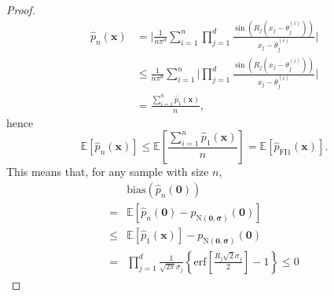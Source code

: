 \documentclass[%
 reprint,
 amsmath,amssymb,
 aps,
]{revtex4-2}
\def\E{\mathbb{E}}
\def\erf{\text{erf}}
\begin{document}
\begin{proof}
\begin{align*}
    \hat{p}_{n}(\mathbf{x}) & = \bigg|\frac{1}{n\pi^d}\sum_{i = 1}^n \prod_{j = 1}^d \frac{\sin(R_j(x_j - \theta_j^{(i)}))}{x_j - \theta_j^{(i)}}\bigg| \\
    & \le \frac{1}{n\pi^d}\sum_{i = 1}^n \bigg|\prod_{j = 1}^d \frac{\sin(R_j(x_j - \theta_j^{(i)}))}{x_j - \theta_j^{(i)}}\bigg|\\
    & = \frac{\sum_{i=1}^n\hat{p}_{\text{1}}(\mathbf{x})}{n},
    \end{align*}
    hence
    $$
    \E[\hat{p}_{n}(\mathbf{x})] \le \E\left[\frac{\sum_{i=1}^n\hat{p}_{\text{1}}(\mathbf{x})}{n}\right] = \E[\hat{p}_{\text{FI}1}(\mathbf{x})].
    $$
    This means that, for any sample with size $n$,
    \begin{align*}
        & \text{bias}(\hat{p}_n(\mathbf{0})) \\
        = & \E[\hat{p}_{n}(\mathbf{0}) - p_{\text{N}(\mathbf{0}, \boldsymbol{\sigma})}(\mathbf{0})] \\
        \le & \E[\hat{p}_{\text{1}}(\mathbf{x})] - p_{\text{N}(\mathbf{0}, \boldsymbol{\sigma})}(\mathbf{0})\\
        = & \prod_{j=1}^d \frac{1}{\sqrt{2\pi}\sigma_j}\left\{\erf\left[\frac{R_j \sqrt{2}\sigma_j}{2} \right]-1 \right\} \le 0
    \end{align*}
\end{proof}



\end{document}
